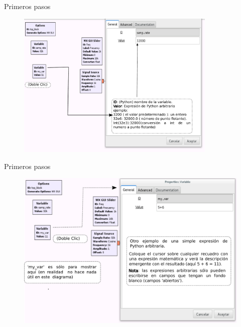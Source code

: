 \begin{frame}{Primeros pasos }
\begin{figure}[H]
\vspace{-3mm}
\centering
\includegraphics[width=0.85\textwidth]{parte1/lab1/pdf/lab1_9.pdf}
\end{figure}
\end{frame}

\begin{frame}{Primeros pasos }
\begin{figure}[H]
\vspace{-3mm}
\centering
\includegraphics[width=.9\textwidth]{parte1/lab1/pdf/lab1_10.pdf}
\end{figure}
\end{frame}

